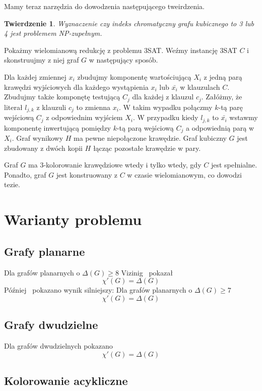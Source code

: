 \documentclass[12pt]{article}
\newtheorem{theorem}{Twierdzenie}
\begin{document}
Mamy teraz narzędzia do dowodzenia następującego tweirdzenia.

\begin{theorem}
    Wyznaczenie czy indeks chromatyczny grafu kubicznego to 3 lub 4 jest problemem NP-zupełnym.
\end{theorem}

Pokażmy wielomianową redukcję z problemu 3SAT. Weźmy instancję 3SAT $C$ i skonstruujmy z niej graf $G$ w następujący sposób.

Dla każdej zmiennej $x_i$ zbudujmy komponentę wartościującą $X_i$ z jedną parą krawędzi wyjściowych dla każdego wystąpienia $x_i$ lub $\bar{x_i}$ w klauzulach $C$. Zbudujmy także komponętę testującą $C_j$ dla każdej z klauzul $c_j$. Załóżmy, że literał $l_{j,k}$ z klauzuli $c_j$ to zmienna $x_i$. W takim wypadku połączmy $k$-tą parę wejściową $C_j$ z odpowiednim wyjściem $X_i$. W przypadku kiedy $l_{j,k}$ to $\bar{x_i}$ wstawmy komponentę inwertującą pomiędzy $k$-tą parą wejściową $C_j$ a odpowiednią parą w $X_i$. Graf wynikowy $H$ ma pewne niepołączone krawędzie. Graf kubiczny $G$ jest zbudowany z dwóch kopii $H$ łącząc pozostałe krawędzie w pary.

Graf $G$ ma 3-kolorowanie krawędziowe wtedy i tylko wtedy, gdy $C$ jest spełnialne. Ponadto, graf $G$ jest konstruowany z $C$ w czasie wielomianowym, co dowodzi tezie.

\section{Warianty problemu}

\subsection{Grafy planarne}

Dla grafów planarnych o $\Delta(G) \geq 8$ Vizinig~\cite{1571980075458819456} pokazał
\[\chi'(G) = \Delta(G)\]
Później~\cite{SANDERS2001201} pokazano wynik silniejszy: Dla grafów planarnych o $\Delta(G) \geq 7$
\[\chi'(G) = \Delta(G)\]

\subsection{Grafy dwudzielne}

Dla grafów dwudzielnych pokazano~\cite{König1916}
\[\chi'(G) = \Delta(G)\]

\subsection{Kolorowanie acykliczne}
\end{document}
